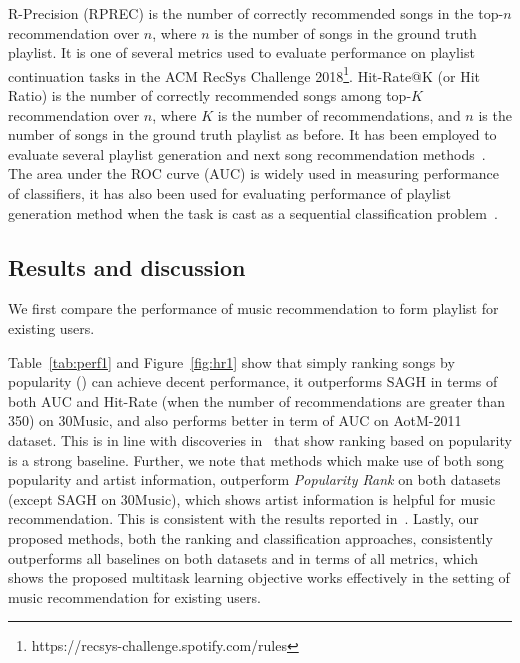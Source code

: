 R-Precision (RPREC) is the number of correctly recommended songs in the top-$n$ recommendation over $n$,
where $n$ is the number of songs in the ground truth playlist.
It is one of several metrics used to evaluate performance on playlist continuation tasks
in the ACM RecSys Challenge 2018\footnote{https://recsys-challenge.spotify.com/rules}.
%
Hit-Rate@K (or Hit Ratio) is the number of correctly recommended songs among top-$K$ recommendation over $n$,
where $K$ is the number of recommendations, and $n$ is the number of songs in the ground truth playlist as before.
It has been employed to evaluate several playlist generation and next song recommendation
methods~\cite{hariri2012context,bonnin2013evaluating,bonnin2015automated,jannach2015beyond}.
%
The area under the ROC curve (AUC) is widely used in measuring performance of classifiers,
it has also been used for evaluating performance of playlist generation method when the task
is cast as a sequential classification problem~\cite{ben2017groove}.


\subsection{Results and discussion}
We first compare the performance of music recommendation to form playlist for existing users.

Table~\ref{tab:perf1} and Figure~\ref{fig:hr1} show that simply ranking songs by popularity ()
can achieve decent performance,
it outperforms SAGH in terms of both AUC and Hit-Rate (when the number of recommendations are greater than 350) on 30Music,
and also performs better in term of AUC on AotM-2011 dataset.
This is in line with discoveries in~\cite{bonnin2013evaluating,jannach2015beyond,bonnin2015automated} that show ranking based on
popularity is a strong baseline.
Further, we note that methods which make use of both song popularity and artist information,
outperform {\it Popularity Rank} on both datasets (except SAGH on 30Music), which shows artist information is helpful for music recommendation.
This is consistent with the results reported in~\cite{bonnin2013evaluating,bonnin2015automated}.
Lastly, our proposed methods, both the ranking and classification approaches, consistently outperforms all baselines
on both datasets and in terms of all metrics, which shows the proposed multitask learning objective works effectively
in the setting of music recommendation for existing users.

